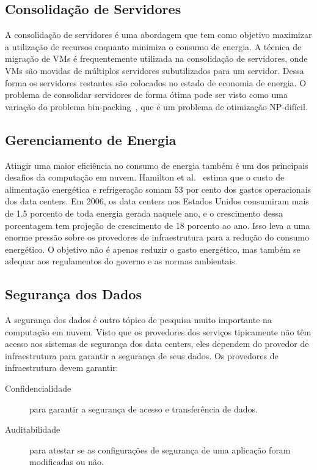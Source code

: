 	\subsection{Consolidação de Servidores}
	A consolidação de servidores é uma abordagem que tem como objetivo maximizar a utilização de recursos enquanto minimiza o consumo de energia. A técnica de migração de VMs é frequentemente utilizada na consolidação de servidores, onde VMs são movidas de múltiplos servidores subutilizados para um servidor. Dessa forma os servidores restantes são colocados no estado de economia de energia. O problema de consolidar servidores de forma ótima pode ser visto como uma variação do problema bin-packing~\cite{Chekuri:1999}, que é um problema de otimização NP-difícil.
	
	\subsection{Gerenciamento de Energia}
	Atingir uma maior eficiência no consumo de energia também é um dos principais desafios da computação em nuvem. Hamilton et al.~\citeyearpar{Hamilton} estima que o custo de alimentação energética e refrigeração somam 53 por cento dos gastos operacionais dos data centers. Em 2006, os data centers nos Estados Unidos consumiram mais de 1.5 porcento de toda energia gerada naquele ano, e o crescimento dessa porcentagem tem projeção de crescimento de 18 porcento ao ano. Isso leva a uma enorme pressão sobre os provedores de infraestrutura para a redução do consumo energético. O objetivo não é apenas reduzir o gasto energético, mas também se adequar aos regulamentos do governo e as normas ambientais. 
	
	\subsection{Segurança dos Dados}
	A segurança dos dados é outro tópico de pesquisa muito importante na computação em nuvem. Visto que os provedores dos serviços tipicamente não têm acesso aos sistemas de segurança dos data centers, eles dependem do provedor de infraestrutura para garantir a segurança de seus dados. Os provedores de infraestrutura devem garantir:
	\begin{description}
		\item[Confidencialidade] para garantir a segurança de acesso e transferência de dados.
                   
		\item[Auditabilidade] para atestar se as configurações de segurança de uma aplicação foram modificadas ou não.  
	\end{description}	 
	
